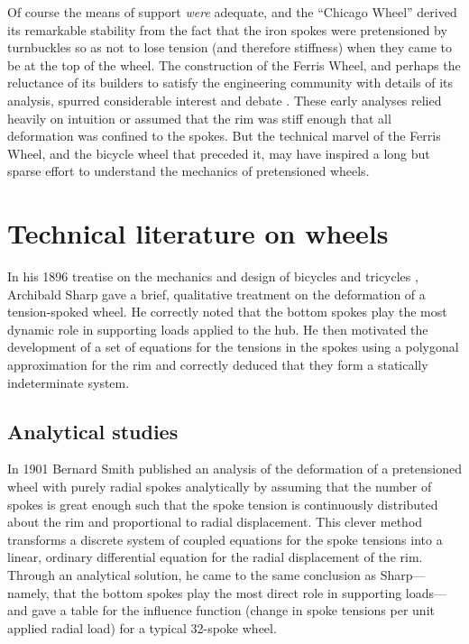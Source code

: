 \documentclass[../thesis.tex]{subfiles}
\begin{document}
Of course the means of support \emph{were} adequate, and the ``Chicago Wheel'' derived its remarkable stability from the fact that the iron spokes were pretensioned by turnbuckles so as not to lose tension (and therefore stiffness) when they came to be at the top of the wheel. The construction of the Ferris Wheel, and perhaps the reluctance of its builders to satisfy the engineering community with details of its analysis, spurred considerable interest and debate \cite{Searles1893}. These early analyses relied heavily on intuition or assumed that the rim was stiff enough that all deformation was confined to the spokes. But the technical marvel of the Ferris Wheel, and the bicycle wheel that preceded it, may have inspired a long but sparse effort to understand the mechanics of pretensioned wheels.


\section{Technical literature on wheels}


In his 1896 treatise on the mechanics and design of bicycles and tricycles \cite{Sharp1977}, Archibald Sharp gave a brief, qualitative treatment on the deformation of a tension-spoked wheel. He correctly noted that the bottom spokes play the most dynamic role in supporting loads applied to the hub. He then motivated the development of a set of equations for the tensions in the spokes using a polygonal approximation for the rim and correctly deduced that they form a statically indeterminate system.

\subsection{Analytical studies}

In 1901 Bernard Smith \cite{Smith1901} published an analysis of the deformation of a pretensioned wheel with purely radial spokes analytically by assuming that the number of spokes is great enough such that the spoke tension is continuously distributed about the rim and proportional to radial displacement. This clever method transforms a discrete system of coupled equations for the spoke tensions into a linear, ordinary differential equation for the radial displacement of the rim. Through an analytical solution, he came to the same conclusion as Sharp---namely, that the bottom spokes play the most direct role in supporting loads---and gave a table for the influence function (change in spoke tensions per unit applied radial load) for a typical 32-spoke wheel.
\end{document}
